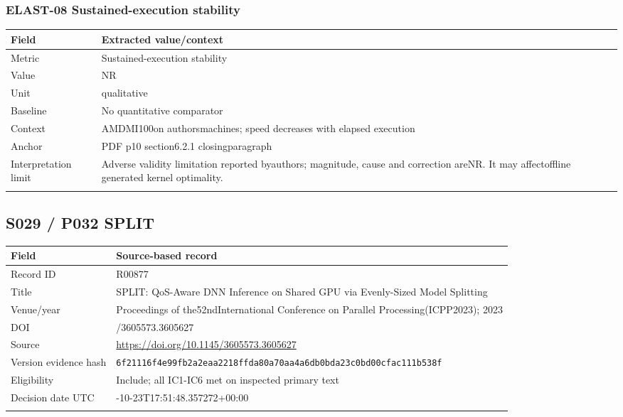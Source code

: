 \subsubsection*{ELAST-08 Sustained-execution stability}
\begin{longtable}{>{\raggedright\arraybackslash}p{}>{\raggedright\arraybackslash}p{}}
\toprule
\textbf{Field} & \textbf{Extracted value/context}\\\midrule\endhead
Metric & Sustained-execution stability\\\addlinespace
Value & NR\\\addlinespace
Unit & qualitative\\\addlinespace
Baseline & No quantitative comparator\\\addlinespace
Context & AMDMI100on authorsmachines;\allowbreak{} speed decreases with elapsed execution\\\addlinespace
Anchor & PDF p10 section6.2.1 closingparagraph\\\addlinespace
Interpretation limit & Adverse validity limitation reported byauthors;\allowbreak{} magnitude,\allowbreak{} cause and correction areNR. It may affectoffline generated kernel optimality.\\\addlinespace
\bottomrule\end{longtable}
\clearpage\subsection{S029 / P032 SPLIT}
\cite{s029}
\begin{longtable}{>{\raggedright\arraybackslash}p{}>{\raggedright\arraybackslash}p{}}
\toprule
\textbf{Field} & \textbf{Source-based record}\\\midrule\endhead
Record ID & R00877\\\addlinespace
Title & SPLIT: QoS-Aware DNN Inference on Shared GPU via Evenly-Sized Model Splitting\\\addlinespace
Venue/year & Proceedings of the52ndInternational Conference on Parallel Processing(ICPP2023);\allowbreak{} 2023\\\addlinespace
DOI & 10.1145/3605573.3605627\\\addlinespace
Source & \url{https://doi.org/10.1145/3605573.3605627}\\\addlinespace
Version evidence hash & \nolinkurl{6f21116f4e99fb2a2eaa2218ffda80a70aa4a6db0bda23c0bd00cfac111b538f}\\\addlinespace
Eligibility & Include;\allowbreak{} all IC1-IC6 met on inspected primary text\\\addlinespace
Decision date UTC & 2026-10-23T17:51:48.357272+00:00\\\addlinespace
\bottomrule\end{longtable}
